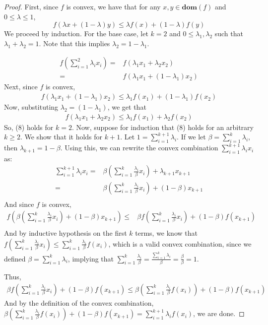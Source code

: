 \documentclass[10pt]{article}
\newcommand{\domain}[1]{\mathbf{dom}(#1)}
\theoremstyle{remark}
\theoremstyle{definition}
\begin{document}
\begin{proof}
	First, since $f$ is convex, we have that for any $x,y \in \domain{f}$ 
	and $0 \leq \lambda \leq 1$, 
	\[ f(\lambda x + (1-\lambda)y) \leq \lambda f(x) + (1-\lambda)f(y) \]
	We proceed by induction. For the base case, let $k=2$ and $0 \leq \lambda_1, \lambda_2$ 
	such that $\lambda_1 + \lambda_2 = 1$. Note that this implies $\lambda_2 = 1-\lambda_1$. 

	\begin{align*}
		f\left(\sum_{i=1}^2 \lambda_i x_i\right) =& f(\lambda_1 x_1 + \lambda_2 x_2)\\
		=& f(\lambda_1 x_1 + (1-\lambda_1)x_2)  
	\end{align*}
	Next, since $f$ is convex,
	\begin{align*}
		f(\lambda_1 x_1 + (1-\lambda_1)x_2)   \leq \lambda_1 f(x_1) + (1-\lambda_1)f(x_2)
	\end{align*}
	Now, substituting $\lambda_2 = (1-\lambda_1)$, we get that 
	\begin{align*}
		f(\lambda_1 x_1 + \lambda_2x_2)\leq \lambda_1 f(x_1) + \lambda_2f(x_2)
	\end{align*}
	So, (8) holds for $k=2$. Now, suppose for induction that (8) holds for an 
	arbitrary $k \geq 2$. We show that it holds for $k+1$. Let 
	$1 = \sum_{i=1}^{k+1}\lambda_i$. If we let $\beta = \sum_{i=1}^{k}\lambda_i$, 
	then $\lambda_{k+1} = 1-\beta$. Using this, we can rewrite 
	the convex combination $\sum_{i=1}^{k+1} \lambda_i x_i$ as:
	\begin{align*}
		\sum_{i=1}^{k+1}\lambda_i x_i =& \beta \left(\sum_{i=1}^k \frac{\lambda_i}{\beta} x_i \right)+ \lambda_{k+1}x_{k+1}\\
		=& \beta \left(\sum_{i=1}^k \frac{\lambda_i}{\beta} x_i \right)+ (1-\beta)x_{k+1}\\
	\end{align*}
	And since $f$ is convex, 
	\begin{align*}
		f\left(\beta \left(\sum_{i=1}^k \frac{\lambda_i}{\beta} x_i \right)+ ( 1 - \beta)x_{k+1}\right) \leq& \beta f\left(\sum_{i=1}^k \frac{\lambda_i}{\beta}x_i\right) + (1-\beta)f(x_{k+1})\\
	\end{align*}
	And by inductive hypothesis on the first $k$ terms, we know that 
	$f\left(\sum_{i=1}^k \frac{\lambda_i}{\beta} x_i\right) \leq \sum_{i=1}^k \frac{\lambda_i}{\beta} f(x_i)$,
	which is a valid convex combination, since we defined $\beta = \sum_{i=1}^k \lambda_i$, implying that 
	$\sum_{i=1}^k\frac{\lambda_i}{\beta} = \frac{\sum_{i=1}^k\lambda_i}{\beta} = \frac{\beta}{\beta }=1$.

	Thus, 
	\begin{align*}
		\beta f\left(\sum_{i=1}^k \frac{\lambda_i}{\beta}x_i\right) + (1-\beta)f(x_{k+1}) \leq \beta \left(\sum_{i=1}^k\frac{\lambda_i}{\beta}f(x_i) \right)+ (1-\beta)f(x_{k+1})
	\end{align*}
	And by the definition of the convex combination, $ \beta \left(\sum_{i=1}^k\frac{\lambda_i}{\beta}f(x_i) \right)+ (1-\beta)f(x_{k+1})= \sum_{i=1}^{k+1}\lambda_i f(x_i)$, we are done.
\end{proof}
\end{document}
